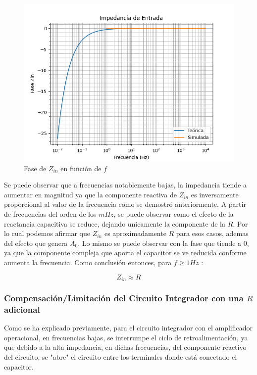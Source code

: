 \begin{figure}[H]
    \centering 
    \includegraphics [scale=1] {../Ejercicio3-CircuitoIntegradoresyDerivadores/Imagenes/comparativo-integrador-zin-fase.png} 
    \caption{Fase de $Z_{in}$ en función de $f$ }
    \label{fig:emptyPlotTool}
\end{figure}

Se puede observar que a frecuencias notablemente bajas, la impedancia tiende a aumentar en magnitud ya que la componente reactiva de 
$Z_{in}$ es inversamente proporcional al valor de la frecuencia como se demostró anteriormente.
A partir de frecuencias del orden de los $mHz$, se puede observar como el efecto de la reactancia capacitiva 
se reduce, dejando unicamente la componente de la $R$. Por lo cual podemos afirmar que $Z_{in}$ es aproximadamente $R$ para esos casos, ademas del efecto que genera $A_0$.
Lo mismo se puede observar con la fase que tiende a 0, ya que la componente compleja que aporta el capacitor se ve reducida conforme aumenta la frecuencia.
Como conclusión entonces, para $f \geq 1Hz$ :

$$Z_{in} \approx R$$

\subsubsection{Compensación/Limitación del Circuito Integrador con una $R$ adicional}

Como se ha explicado previamente, para el circuito integrador con el amplificador operacional, en frecuencias bajas, se interrumpe el ciclo de retroalimentación,
ya que debido a la alta impedancia, en dichas frecuencias, del componente reactivo del circuito, se "abre" el  circuito entre los terminales donde está conectado el capacitor.

